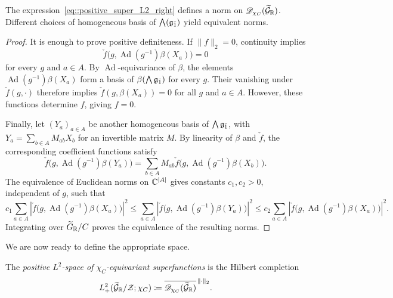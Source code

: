 \begin{lemma}\label{lemm::norm}
The expression~\eqref{eq::positive_super_L2_right} defines a norm on $\mathscr D_{\chi_C}(\widetilde{{\mathcal{G}}}_{{\mathbb R}})$. Different choices of homogeneous basis of $\bigwedge({\mathfrak{g}_{\bar{1}}})$ yield equivalent norms.
\end{lemma}
\begin{proof}
It is enough to prove positive definiteness. If $\|f\|_2=0$, continuity implies
\[
\check f\bigl(g,\operatorname{Ad}(g^{-1})\beta(X_a)\bigr)=0
\]
for every $g$ and $a\in A$. 
By $\operatorname{Ad}$-equivariance of $\beta$, the elements $\operatorname{Ad}(g^{-1})\beta(X_a)$ form a basis of $\beta(\bigwedge{\mathfrak{g}_{\bar{1}}})$ for every $g$. Their vanishing under $\check f(g,\cdot)$ therefore implies
$
\check f(g,\beta(X_a))=0
$
for all $g$ and $a\in A$. However, these functions determine $f$, giving $f=0$.


Finally, let $(Y_a)_{a\in A}$ be another homogeneous basis of $\bigwedge{\mathfrak{g}_{\bar{1}}}$, with $Y_a=\sum_{b\in A}M_{ab}X_b$ for an invertible matrix $M$. By linearity of $\beta$ and $\check f$, the corresponding coefficient functions satisfy
\[
\check f\bigl(g,\operatorname{Ad}(g^{-1})\beta(Y_a)\bigr)
=
\sum_{b\in A}M_{ab}\check f\bigl(g,\operatorname{Ad}(g^{-1})\beta(X_b)\bigr).
\]
The equivalence of Euclidean norms on ${\mathbb C}^{|A|}$ gives constants $c_{1},c_{2}>0$, independent of $g$, such that
\[
c_{1}\sum_{a\in A}\left|\check f\bigl(g,\operatorname{Ad}(g^{-1})\beta(X_a)\bigr)\right|^2
\leq
\sum_{a\in A}\left|\check f\bigl(g,\operatorname{Ad}(g^{-1})\beta(Y_a)\bigr)\right|^2
\leq
c_{2}\sum_{a\in A}\left|\check f\bigl(g,\operatorname{Ad}(g^{-1})\beta(X_a)\bigr)\right|^2.
\]
Integrating over $\widetilde{G}_{{\mathbb R}}/C$ proves the equivalence of the resulting norms.
\end{proof}

We are now ready to define the appropriate space.

\begin{definition}
The \emph{positive $L^2$-space of $\chi_C$-equivariant superfunctions} is the Hilbert completion
\begin{equation*}
L^2_+(\widetilde{{\mathcal{G}}}_{{\mathbb R}}/{\mathcal{Z}};\chi_C)
\coloneqq
\overline{
\mathscr D_{\chi_C}(\widetilde{{\mathcal{G}}}_{{\mathbb R}})
}^{\,\|\cdot\|_2}.
\end{equation*}
\end{definition}


